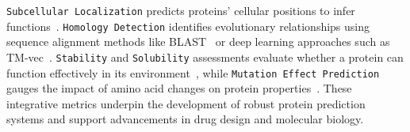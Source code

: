 \texttt{Subcellular Localization} predicts proteins' cellular positions to infer functions~\cite{briesemeister2010yloc,holm2020dali}. \texttt{Homology Detection} identifies evolutionary relationships using sequence alignment methods like BLAST~\cite{altschul1990basic} or deep learning approaches such as TM-vec~\cite{hamamsy2024protein}. \texttt{Stability} and \texttt{Solubility} assessments evaluate whether a protein can function effectively in its environment~\cite{cheng2006prediction,hebditch2017protein}, while \texttt{Mutation Effect Prediction} gauges the impact of amino acid changes on protein properties~\cite{mansoor2022accurate}. These integrative metrics underpin the development of robust protein prediction systems and support advancements in drug design and molecular biology.
